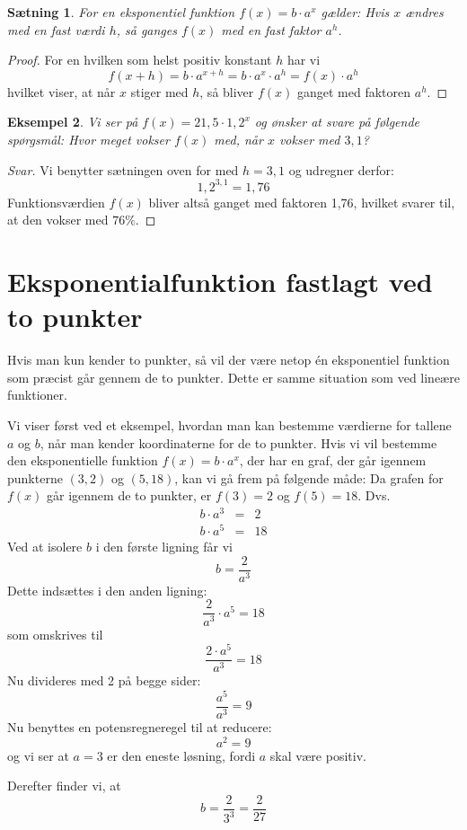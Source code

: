 \documentclass[12pt,oneside,a4paper]{article}
\newcommand{\bas}{\begin{eqnarray*}}
\newcommand{\eas}{\end{eqnarray*}}
\newtheorem{thm}{Sætning}[section]
\newtheorem{eks}[thm]{Eksempel}
\begin{document}
\begin{thm}
    For en eksponentiel funktion $f(x) = b\cdot a^x$ gælder: Hvis $x$ ændres
    med en fast værdi $h$, så ganges $f(x)$ med en fast faktor $a^h$.
\end{thm}
\begin{proof}
    For en hvilken som helst positiv konstant $h$ har vi
    $$
    f(x+h) = b\cdot a^{x+h} = b\cdot a^x\cdot  a^h = f(x)\cdot  a^h
    $$
    hvilket viser, at når $x$ stiger med $h$, så bliver $f(x)$ ganget med
    faktoren $a^h$. 
\end{proof}

\begin{eks}
    Vi ser på $f(x) = 21,5 \cdot 1,2^x$ og ønsker at svare på følgende
    spørgsmål: Hvor meget vokser $f(x)$ med, når $x$ vokser med $3,1$?
\end{eks}
\begin{proof}[Svar]
    Vi benytter sætningen oven for med $h=3,1$ og udregner derfor:
    $$
    1,2^{3,1} = 1,76 
    $$
    Funktionsværdien $f(x)$ bliver altså ganget med faktoren 1,76, hvilket
    svarer til, at den vokser med $76\%$.
\end{proof}


\section{Eksponentialfunktion fastlagt ved to punkter}
Hvis man kun kender to punkter, så vil der være netop én eksponentiel funktion
som præcist går gennem de to punkter. Dette er samme situation som ved lineære
funktioner.

Vi viser først ved et eksempel, hvordan man kan bestemme værdierne for tallene
$a$ og $b$, når man kender koordinaterne for de to punkter.
Hvis vi vil bestemme den eksponentielle funktion $f(x) = b\cdot a^x$, der har en
graf, der går igennem punkterne $(3, 2)$ og $(5, 18)$, kan vi gå frem på
følgende måde:
Da grafen for $f(x)$ går igennem de to punkter, er $f(3) = 2$ og $f(5) = 18$. Dvs.
\bas
b \cdot a^3  &=& 2\\
b \cdot a^5  &=& 18
\eas
Ved at isolere $b$ i den første ligning får vi
$$
b = \frac{2}{a^3}
$$
Dette indsættes i den anden ligning:
$$
\frac{2}{a^3} \cdot a^5 = 18
$$
som omskrives til
$$
\frac{2 \cdot a^5}{a^3} = 18
$$
Nu divideres med 2 på begge sider:
$$
\frac{a^5}{a^3} = 9
$$
Nu benyttes en potensregneregel til at reducere:
$$
a^2 = 9
$$
og vi ser at $a=3$ er den eneste løsning, fordi $a$ skal være positiv.

Derefter finder vi, at 
$$
b = \frac{2}{3^3} = \frac{2}{27}
$$
\end{document}
